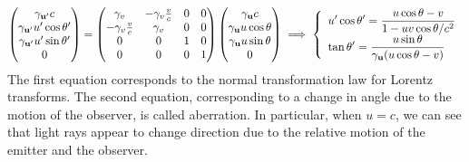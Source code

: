 \[
	\begin{pmatrix}
		\gamma_{\vb u'}c             \\
		\gamma_{\vb u'}u'\cos\theta' \\
		\gamma_{\vb u'}u'\sin\theta' \\
		0
	\end{pmatrix} = \begin{pmatrix}
		\gamma_v              & -\gamma_v \frac{v}{c} & 0 & 0 \\
		-\gamma_v \frac{v}{c} & \gamma_v              & 0 & 0 \\
		0                     & 0                     & 1 & 0 \\
		0                     & 0                     & 0 & 1
	\end{pmatrix} \begin{pmatrix}
		\gamma_{\vb u}c           \\
		\gamma_{\vb u}u\cos\theta \\
		\gamma_{\vb u}u\sin\theta \\
		0
	\end{pmatrix} \implies \left\{ \begin{array}{l}
		\displaystyle
		u'\cos\theta' = \frac{u\cos\theta - v}{1 - uv\cos\theta/c^2}      \\
		\displaystyle
		\tan\theta' = \frac{u\sin\theta}{\gamma_{\vb u}(u\cos\theta - v)} \\
	\end{array} \right.
\]
The first equation corresponds to the normal transformation law for Lorentz transforms.
The second equation, corresponding to a change in angle due to the motion of the observer, is called aberration.
In particular, when \(u = c\), we can see that light rays appear to change direction due to the relative motion of the emitter and the observer.

